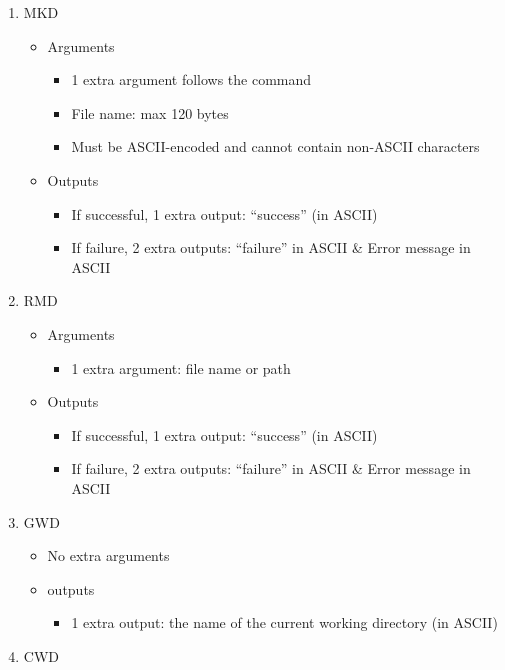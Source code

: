 \documentclass[12pt]{article}
\begin{document}
\begin{enumerate}
    \item MKD
    \begin{itemize}
        \item Arguments
        \begin{itemize}
            \item 1 extra argument follows the command
            \item File name: max 120 bytes
            \item Must be ASCII-encoded and cannot contain non-ASCII characters
        \end{itemize}
        \item Outputs
        \begin{itemize}
           \item If successful, 1 extra output: “success” (in ASCII)
           \item If failure, 2 extra outputs: “failure” in ASCII \& Error message in ASCII
        \end{itemize}
    \end{itemize}
    \item RMD
    \begin{itemize}
        \item Arguments
        \begin{itemize}
            \item 1 extra argument: file name or path
        \end{itemize}
        \item Outputs
        \begin{itemize}
           \item If successful, 1 extra output: “success” (in ASCII)
           \item If failure, 2 extra outputs: “failure” in ASCII \& Error message in ASCII
        \end{itemize}
    \end{itemize}
    \item GWD 
    \begin{itemize}
        \item No extra arguments
        \item outputs
        \begin{itemize}
           \item 1 extra output: the name of the current working directory (in ASCII)
        \end{itemize}
    \end{itemize}
    \item CWD

\end{enumerate}
\end{document}
